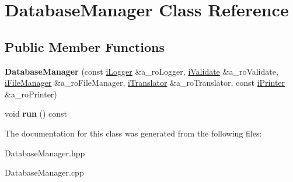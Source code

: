 \hypertarget{class_database_manager}{}\section{Database\+Manager Class Reference}
\label{class_database_manager}
\subsection*{Public Member Functions}
\begin{DoxyCompactItemize}
\item 
\mbox{\label{class_database_manager_a9ac49fa20f4c3a852bb6655e02ef521d}} 
{\bfseries Database\+Manager} (const \mbox{\hyperlink{classi_logger}{i\+Logger}} \&a\+\_\+ro\+Logger, \mbox{\hyperlink{classi_validate}{i\+Validate}} \&a\+\_\+ro\+Validate, \mbox{\hyperlink{classi_file_manager}{i\+File\+Manager}} \&a\+\_\+ro\+File\+Manager, \mbox{\hyperlink{classi_translator}{i\+Translator}} \&a\+\_\+ro\+Translator, const \mbox{\hyperlink{classi_printer}{i\+Printer}} \&a\+\_\+ro\+Printer)
\item 
\mbox{\label{class_database_manager_ac4ba83557c026919f832c4f4f4f9a142}} 
void {\bfseries run} () const
\end{DoxyCompactItemize}


The documentation for this class was generated from the following files\+:\begin{DoxyCompactItemize}
\item 
Database\+Manager.\+hpp\item 
Database\+Manager.\+cpp\end{DoxyCompactItemize}
